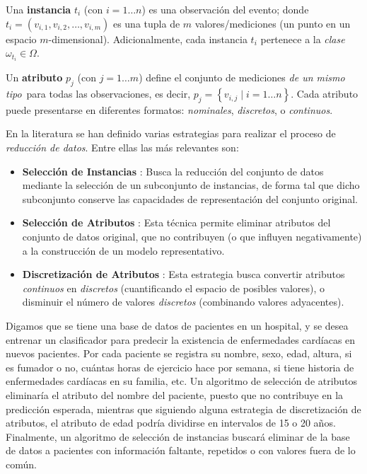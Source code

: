 \begin{definicion}
Una \textbf{instancia} $t_i$ (con $i = 1\dots n$) es una observación del evento; donde $t_i = (v_{i,1}, v_{i,2}, \dots, v_{i,m})$ es una tupla de $m$ valores/mediciones (un punto en un espacio $m$-dimensional). Adicionalmente, cada instancia $t_i$ pertenece a la \emph{clase} $\omega_{t_i} \in \Omega$.\\
\end{definicion}

\begin{definicion}
Un \textbf{atributo} $p_j$ (con $j = 1\dots m$) define el conjunto de mediciones \guillemotleft\emph{de un mismo tipo}\guillemotright\ para todas las observaciones, es decir, $p_j = \left\{ v_{i,j} \mid i = 1\dots n \right\}$. Cada atributo puede presentarse en diferentes formatos: \emph{nominales}, \emph{discretos}, o \emph{continuos}.
\end{definicion}

En la literatura se han definido varias estrategias para realizar el proceso de \emph{reducción de datos}. Entre ellas las más relevantes son:

\begin{itemize}
\item \textbf{Selección de Instancias}
\cite{DBLP:journals/ai/BlumL97,Liu:2002:IIS:593433.593525}: Busca la reducción del conjunto de datos mediante la selección de un subconjunto de instancias, de forma tal que dicho subconjunto conserve las capacidades de representación del conjunto original.
\item \textbf{Selección de Atributos}
\cite{DBLP:journals/ai/BlumL97, Liu:1998:FEC:551943}: Esta técnica permite eliminar atributos del conjunto de datos original, que no contribuyen (o que influyen negativamente) a la construcción de un modelo representativo.
\item \textbf{Discretización de Atributos}
\cite{DBLP:conf/ijcai/FayyadI93, Liu:2002:DET:593435.593535}: Esta estrategia busca convertir atributos \emph{continuos} en \emph{discretos} (cuantificando el espacio de posibles valores), o disminuir el número de valores \emph{discretos} (combinando valores adyacentes).
\end{itemize}

Digamos que se tiene una base de datos de pacientes en un hospital, y se desea entrenar un clasificador para predecir la existencia de enfermedades cardíacas en nuevos pacientes. Por cada paciente se registra su nombre, sexo, edad, altura, si es fumador o no, cuántas horas de ejercicio hace por semana, si tiene historia de enfermedades cardíacas en su familia, etc. Un algoritmo de selección de atributos eliminaría el atributo del nombre del paciente, puesto que no contribuye en la predicción esperada, mientras que siguiendo alguna estrategia de discretización de atributos, el atributo de edad podría dividirse en intervalos de 15 o 20 años. Finalmente, un algoritmo de selección de instancias buscará eliminar de la base de datos a pacientes con información faltante, repetidos o con valores fuera de lo común.

